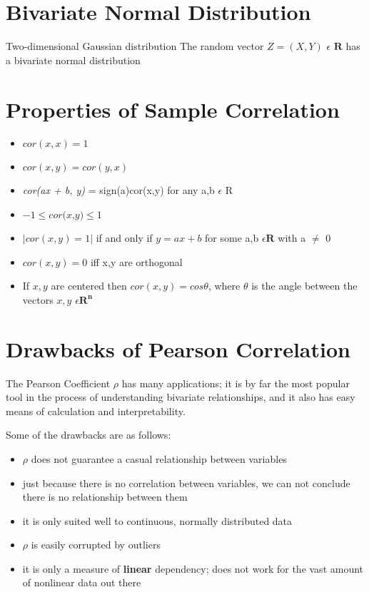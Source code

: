 \documentclass[11pt]{article}
\begin{document}
\section{Bivariate Normal Distribution}
Two-dimensional Gaussian distribution
The random vector $Z = (X,Y)$ $\epsilon$ $\mathbf{R}$ has a bivariate normal distribution


\section{Properties of Sample Correlation}

\begin{itemize}
\item $cor(x,x) = 1$
\item $cor(x,y) = cor(y,x)$
\item \textit{cor(ax + b, y)} = sign(a)cor(x,y) for any a,b $\epsilon$ R
\item $-1 \leq \textit{cor(x,y)}  \leq 1 $
\item $|cor(x,y)  =  1|$ if and only if $y = ax + b$ for some a,b $\epsilon \mathbf{R}$ with a $\neq$ 0
\item $cor(x,y) = 0$ iff x,y are orthogonal
\item If $x,y$ are centered then $cor(x,y) = cos\theta$, where $\theta$ is the angle between the vectors $x,y$ $\epsilon \mathbf{R^n}$ 



\end{itemize}

\section{Drawbacks of Pearson Correlation}
The Pearson Coefficient $\rho$ has many applications; it is by far the most popular tool in the process of understanding bivariate relationships, and it also has easy means of calculation and interpretability.

Some of the drawbacks are as follows:

\begin{itemize}
\item $\rho$ does not guarantee a casual relationship between variables
\item just because there is no correlation between variables, we can not conclude there is no relationship between them
\item it is only suited well to continuous, normally distributed data
\item $\rho$ is easily corrupted by outliers
\item it is only a measure of \textbf{linear} dependency; does not work for the vast amount of nonlinear data out there

\end{itemize}
\end{document}
